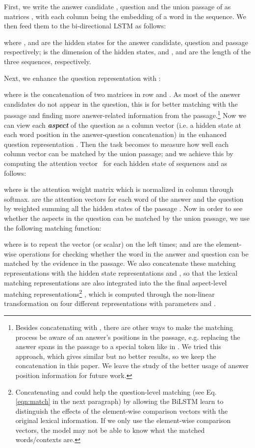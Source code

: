 \documentclass{article} \usepackage{iclr2018_conference,times}
\begin{document}
First, we write the answer candidate , question  and the union passage  of  as matrices , with each column being the embedding of a word in the sequence. We then feed them to the bi-directional LSTM as follows:

where  ,  and   are the hidden states for the answer candidate, question and passage respectively;
 is the dimension of the hidden states, and ,  and  are the length of the three sequences, respectively. 

Next, we enhance the question representation  with :

where  is the concatenation of two matrices in row and . As most of the answer candidates do not appear in the question, this is for better matching with the passage and finding more answer-related information from the passage.\footnote{Besides concatenating  with , there are other ways to make the matching process be aware of an answer's positions in the passage, e.g. replacing the answer spans in the passage to a special token like in \cite{yih-EtAl:2015:ACL-IJCNLP}. We tried this approach, which gives similar but no better results, so we keep the concatenation in this paper. We leave the study of the better usage of answer position information for future work.}
Now we can view each \textbf{\emph{aspect}} of the question as a column vector (i.e. a hidden state at each word position in the answer-question concatenation) in the enhanced question representation . Then the task becomes to measure how well each column vector can be matched by the union passage; and we achieve this by computing the attention vector~\cite{parikh2016decomposable} for each hidden state of sequences  and  as follows:

where  is the attention weight matrix which is normalized in column through softmax.  are the attention vectors for each word of the answer and the question by weighted summing all the hidden states of the passage . Now in order to see whether the aspects in the question can be matched by the union passage, we use the following matching function:

where  is to repeat the vector (or scalar) on the left  times;  and  are the element-wise operations for checking whether the word in the answer and question can be matched by the evidence in the passage. We also concatenate these matching representations with the hidden state representations  and ,
so that the lexical matching representations are also integrated into the
the final aspect-level matching representations\footnote{Concatenating  and  could help the question-level matching (see Eq. \ref{eqn:match} in the next paragraph) by allowing the BiLSTM learn to distinguish the effects of the element-wise comparison vectors with the original lexical information. If we only use the element-wise comparison vectors, the model may not be able to know what the matched words/contexts are.}
, which is computed through the non-linear transformation on four different representations with parameters  and . 
\end{document}
